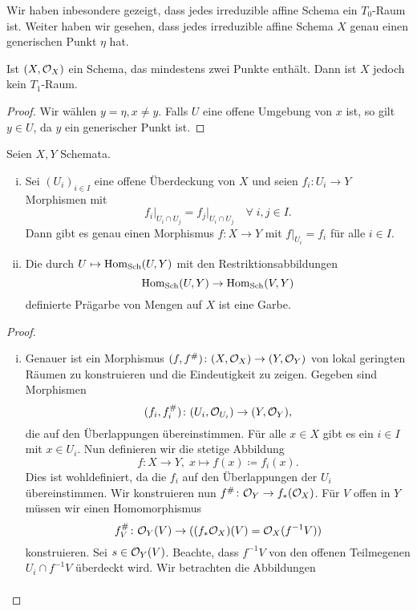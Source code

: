 \begin{bem*}
	Wir haben inbesondere gezeigt, dass jedes irreduzible affine Schema ein $T_0$-Raum ist. Weiter haben wir gesehen, dass jedes irreduzible affine Schema $X$ genau einen generischen Punkt $\eta$ hat.

	Ist $(X,\mathcal{O}_X)$ ein Schema, das mindestens zwei Punkte enthält. Dann ist $X$ jedoch kein $T_1$-Raum.
	\begin{proof}
		Wir wählen $y = \eta, x \neq y$. Falls $U$ eine offene Umgebung von $x$ ist, so gilt $y \in U$, da $y$ ein generischer Punkt ist.		
	\end{proof}
\end{bem*}

\begin{lem}
\label{lem:5.5}
	Seien $X,Y$ Schemata.
	\begin{enumerate}[i)]
		\item Sei $(U_i)_{i\in I}$ eine offene Überdeckung von $X$ und seien $f_i\colon U_i\to Y$ Morphismen mit
		\[
			f_i\vert_{U_i\cap U_j} = f_j\vert_{U_i\cap U_j} \quad \forall\; i,j \in I.
		\]
		Dann gibt es genau einen Morphismus $f \colon X \to Y$ mit $f\vert_{U_i} = f_i$ für alle $i \in I$.
		\item Die durch $U \mapsto \operatorname{Hom}_{\operatorname{Sch}}(U,Y)$ mit den Restriktionsabbildungen
		\[
			\operatorname{Hom}_{\operatorname{Sch}}(U,Y) \to \operatorname{Hom}_{\operatorname{Sch}}(V,Y)
		\]
		definierte Prägarbe von Mengen auf $X$ ist eine Garbe.
	\end{enumerate}
	\begin{proof}
		\begin{enumerate}[i)]
			\item Genauer ist ein Morphismus $(f,f^{\#})\colon (X,\mathcal{O}_X) \to (Y,\mathcal{O}_Y)$ von lokal geringten Räumen zu konstruieren und die Eindeutigkeit zu zeigen. Gegeben sind Morphismen
			\[
				(f_i,f_i^{\#})\colon (U_i,\mathcal{O}_{U_i}) \to (Y,\mathcal{O}_Y),
			\]
			die auf den Überlappungen übereinstimmen. Für alle $x \in X$ gibt es ein $i \in I$ mit $x \in U_i$. Nun definieren wir die stetige Abbildung
			\[
				f\colon X \to Y,\; x \mapsto f(x) \coloneqq f_i(x).
			\]
			Dies ist wohldefiniert, da die $f_i$ auf den Überlappungen der $U_i$ übereinstimmen. Wir konstruieren nun $f^{\#}\colon \mathcal{O}_Y \to f_*(\mathcal{O}_X)$. Für $V$ offen in $Y$ müssen wir einen Homomorphismus
			\[
				f^{\#}_V\colon \mathcal{O}_Y(V) \to ((f_*\mathcal{O}_X)(V) = \mathcal{O}_X(f^{-1}V))
			\]
			konstruieren. Sei $s \in \mathcal{O}_Y(V)$. Beachte, dass $f^{-1}V$ von den offenen Teilmegenen $U_i \cap f^{-1}V$ überdeckt wird. Wir betrachten die Abbildungen
			\begin{align*}

\end{align*}
\end{enumerate}
\end{proof}
\end{lem}
